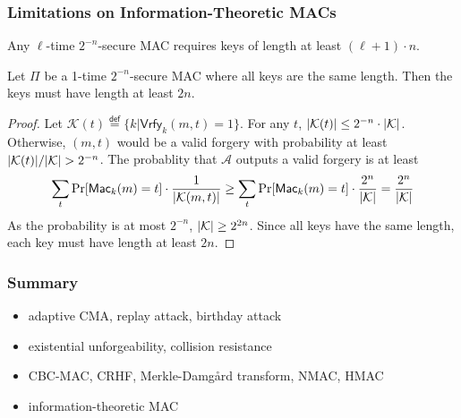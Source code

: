 \begin{frame}\frametitle{Limitations on Information-Theoretic MACs}
Any $\ell$-time $2^{-n}$-secure MAC requires keys of length at least $(\ell +1) \cdot n$. 
\begin{theorem}
Let $\Pi$ be a 1-time $2^{-n}$-secure MAC where all keys are the same length. Then the keys must have length at least $2n$.
\end{theorem}
\begin{proof}
Let $\mathcal{K}(t) \overset{\mathsf{def}}{=} \{ k | \mathsf{Vrfy}_k(m, t) = 1\}$. For any $t$, $\lvert\mathcal{K}(t)\rvert \leq 2^{-n} \cdot \lvert\mathcal{K}\rvert$. Otherwise, $(m, t)$ would be a valid forgery with probability at least $\lvert\mathcal{K}(t)\rvert/\lvert\mathcal{K}\rvert> 2^{-n}$. The probablity that $\mathcal{A}$ outputs a valid forgery is at least
\[ \sum_{t} \Pr [\mathsf{Mac}_k(m) = t] \cdot \frac{1}{\lvert\mathcal{K}(m, t)\rvert} \geq \sum_{t} \Pr [\mathsf{Mac}_k(m) = t] \cdot \frac{2^n}{\lvert\mathcal{K}\rvert} = \frac{2^n}{\lvert\mathcal{K}\rvert} 
\]
As the probability is at most $2^{-n}$, $\lvert\mathcal{K}\rvert \geq 2^{2n}$. Since all keys have the same length, each key must have length at least $2n$.
\end{proof} 
\end{frame}
\begin{frame}\frametitle{Summary}
\begin{itemize}
\item adaptive CMA, replay attack, birthday attack 
\item existential unforgeability, collision resistance
\item CBC-MAC, CRHF, Merkle-Damg\r{a}rd transform, NMAC, HMAC
\item information-theoretic MAC
\end{itemize}
\end{frame}

